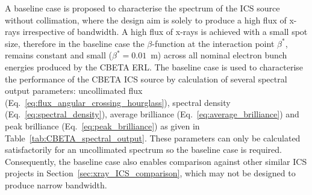 \documentclass[../main.tex]{subfiles}
\begin{document}
A baseline case is proposed to characterise the spectrum of the ICS source without collimation, where the design aim is solely to produce a high flux of x-rays irrespective of bandwidth. A high flux of x-rays is achieved with a small spot size, therefore in the baseline case the $\beta$-function at the interaction point $\beta^{*}$, remains constant and small ($\beta^{*}=0.01$~\si{\meter}) across all nominal electron bunch energies produced by the CBETA ERL. The baseline case is used to characterise the performance of the CBETA ICS source by calculation of several spectral output parameters: uncollimated flux (Eq.~\ref{eq:flux_angular_crossing_hourglass}), spectral density (Eq.~\ref{eq:spectral_density}), average brilliance (Eq.~\ref{eq:average_brilliance}) and peak brilliance (Eq.~\ref{eq:peak_brilliance}) as given in Table~\ref{tab:CBETA_spectral_output}. These parameters can only be calculated satisfactorily for an uncollimated spectrum so the baseline case is required. Consequently, the baseline case also enables comparison against other similar ICS projects in Section~\ref{sec:xray_ICS_comparison}, which may not be designed to produce narrow bandwidth. 
\end{document}
